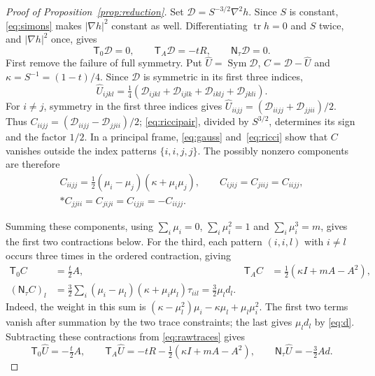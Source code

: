 \documentclass[11pt,a4paper]{amsart}
\numberwithin{equation}{section}
\theoremstyle{definition}
\theoremstyle{remark}
\DeclareMathOperator{\tr}{tr}
\DeclareMathOperator{\Sym}{Sym}
\newcommand{\T}{\mathsf T}
\newcommand{\N}{\mathsf N}
\begin{document}
\begin{proof}[Proof of Proposition~\ref{prop:reduction}]
Set $\mathcal D=S^{-3/2}\nabla^2h$. Since $S$ is constant,
\eqref{eq:simons} makes $|\nabla h|^2$ constant as well.
Differentiating $\tr h=0$ and $S$ twice, and $|\nabla h|^2$ once, gives
\begin{equation}\label{eq:rawtraces}
 \T_0\mathcal D=0,\qquad
 \T_A\mathcal D=-tR,\qquad
 \N_\tau\mathcal D=0.
\end{equation}
First remove the failure of full symmetry. Put
$\widehat U=\Sym\mathcal D$, $C=\mathcal D-\widehat U$ and
$\kappa=S^{-1}=(1-t)/4$.
Since $\mathcal D$ is symmetric in its first three indices,
\[
 \widehat U_{ijkl}=\tfrac14(\mathcal D_{ijkl}+\mathcal D_{ijlk}
                         +\mathcal D_{iklj}+\mathcal D_{jkli}).
\]
For $i\ne j$, symmetry in the first three indices gives
$\widehat U_{iijj}=(\mathcal D_{iijj}+\mathcal D_{jjii})/2$.
Thus $C_{iijj}=(\mathcal D_{iijj}-\mathcal D_{jjii})/2$;
\eqref{eq:riccipair}, divided by $S^{3/2}$, determines its sign
and the factor $1/2$. In a principal frame, \eqref{eq:gauss}
and~\eqref{eq:ricci} show that $C$ vanishes outside the index patterns
$\{i,i,j,j\}$.
The possibly nonzero components are therefore
\begin{gather*}
 C_{iijj}=\tfrac12(\mu_i-\mu_j)(\kappa+\mu_i\mu_j),\qquad
 C_{ijij}=C_{jiij}=C_{iijj},\\*
 C_{jjii}=C_{jiji}=C_{ijji}=-C_{iijj}.
\end{gather*}

Summing these components, using $\sum_i\mu_i=0$, $\sum_i\mu_i^2=1$
and $\sum_i\mu_i^3=m$, gives the first two contractions below.
For the third, each pattern $(i,i,l)$ with $i\ne l$ occurs three
times in the ordered contraction, giving
\begin{align}
 \T_0C&=\tfrac t2A,&
 \T_AC&=\tfrac12(\kappa I+mA-A^2),\label{eq:Ctraces}\\
 (\N_\tau C)_l
 &=\tfrac32\sum_i(\mu_i-\mu_l)(\kappa+\mu_i\mu_l)\tau_{iil}
 =\tfrac32\mu_ld_l.\label{eq:Cthird}
\end{align}
Indeed, the weight in this sum is
$(\kappa-\mu_l^2)\mu_i-\kappa\mu_l+\mu_l\mu_i^2$.
The first two terms vanish after summation by the two trace constraints;
the last gives $\mu_ld_l$ by \eqref{eq:d}.
Subtracting these contractions from \eqref{eq:rawtraces} gives
\begin{equation}\label{eq:Utraces}
 \T_0\widehat U=-\tfrac t2A,\qquad
 \T_A\widehat U=-tR-\tfrac12(\kappa I+mA-A^2),\qquad
 \N_\tau\widehat U=-\tfrac32Ad.
\end{equation}


\end{proof}
\end{document}

